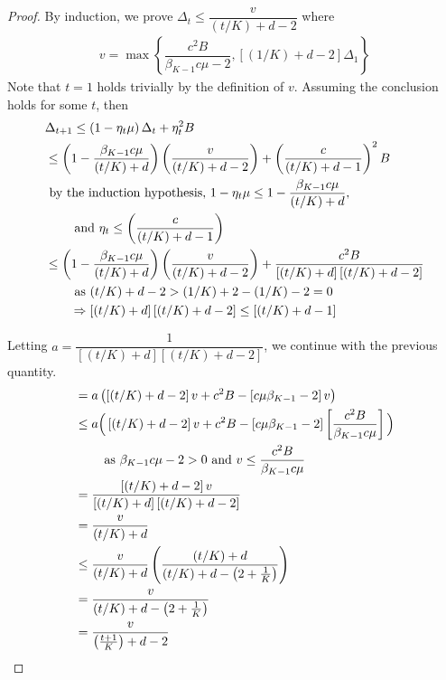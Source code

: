\begin{proof}
    By induction, we prove ${\Delta_t \leq \dfrac{v}{(t/K) + d - 2}}$ where 
    \begin{align*}
        v = \max \left\{ \dfrac{c^2 B}{\beta_{K - 1} c \mu - 2}, \left[ (1/K) + d - 2 \right] \Delta_1 \right\}
    \end{align*}
    Note that $t = 1$ holds trivially by the definition of $v$. Assuming the conclusion holds for some $t$, then
    \begin{align*}
        \allowdisplaybreaks
        & \Delta_{t + 1} \leq \left( 1 - \eta_t \mu \right) \Delta_t + \eta_t^2 B \\
        & \leq \left( 1 - \dfrac{\beta_{K - 1} c \mu}{(t/K) + d} \right) \left( \dfrac{v}{(t/K) + d - 2} \right) %
        + \left( \dfrac{c}{(t/K) + d - 1}\right)^2 B \\
        & \textrm{ by the induction hypothesis, } %
        1 - \eta_t \mu \leq 1 - \dfrac{\beta_{K - 1} c \mu}{(t/K) + d}, \\
        & \qquad \textrm{ and } \eta_t \leq \left( \dfrac{c}{(t/K) + d - 1} \right) \\
        & \leq \left( 1 - \dfrac{\beta_{K - 1} c \mu}{(t/K) + d} \right) \left( \dfrac{v}{(t/K) + d - 2} \right) %
        + \dfrac{c^2B}{\left[ (t/K) + d \right] \left[ (t/K) + d - 2 \right]} \\
        & \qquad \textrm{ as } (t/K) + d - 2 > (1/K) + 2 - (1/K) - 2 = 0 \\
        & \qquad \Rightarrow \left[ (t/K) + d \right] \left[ (t/K) + d - 2 \right] \leq \left[ (t/K) + d - 1 \right]
    \end{align*}

    Letting $a = \dfrac{1}{\left[ (t/K) + d \right] \left[ (t/K) + d - 2 \right]}$, we continue with the previous quantity. 
    \begin{align*}
        \allowdisplaybreaks
        & = a \left( \left[(t/K) + d - 2\right]v + c^2B - \left[ c \mu \beta_{K - 1} - 2 \right]v \right) \\
        & \leq a \Big( \left[(t/K) + d - 2\right]v + c^2B %
        - \left[ c \mu \beta_{K - 1} - 2 \right] \left[ \dfrac{c^2 B}{\beta_{K - 1} c \mu} \right] \Big) \\
        & \qquad \textrm{ as } \beta_{K - 1} c \mu - 2 > 0 \textrm{ and } v \leq \dfrac{c^2 B}{\beta_{K - 1} c \mu}\\
        & = \dfrac{ \left[(t/K) + d - 2\right]v }{\left[ (t/K) + d \right] \left[ (t/K) + d - 2 \right]} \\
        & = \dfrac{v}{(t/K) + d} \\
        & \leq \dfrac{v}{(t/K) + d} \left( \dfrac{(t/K) + d}{(t/K) + d - \left(2 + \frac{1}{K} \right) } \right) \\
        & = \dfrac{v}{(t/K) + d - \left(2 + \frac{1}{K} \right)} \\
        & = \dfrac{v}{\left(\frac{t + 1}{K} \right) + d - 2}
    \end{align*}
    

\end{proof}
